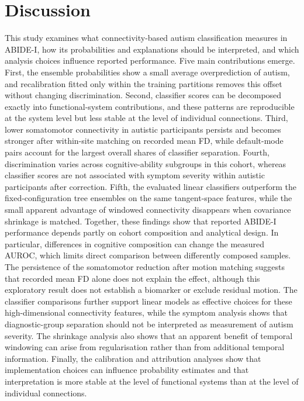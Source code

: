 \section{Discussion}
\label{sec:discussion}

This study examines what connectivity-based autism classification measures in ABIDE-I, how its probabilities and explanations should be interpreted, and which analysis choices influence reported performance. Five main contributions emerge. First, the ensemble probabilities show a small average overprediction of autism, and recalibration fitted only within the training partitions removes this offset without changing discrimination. Second, classifier scores can be decomposed exactly into functional-system contributions, and these patterns are reproducible at the system level but less stable at the level of individual connections. Third, lower somatomotor connectivity in autistic participants persists and becomes stronger after within-site matching on recorded mean FD, while default-mode pairs account for the largest overall shares of classifier separation. Fourth, discrimination varies across cognitive-ability subgroups in this cohort, whereas classifier scores are not associated with symptom severity within autistic participants after correction. Fifth, the evaluated linear classifiers outperform the fixed-configuration tree ensembles on the same tangent-space features, while the small apparent advantage of windowed connectivity disappears when covariance shrinkage is matched. Together, these findings show that reported ABIDE-I performance depends partly on cohort composition and analytical design. In particular, differences in cognitive composition can change the measured AUROC, which limits direct comparison between differently composed samples. The persistence of the somatomotor reduction after motion matching suggests that recorded mean FD alone does not explain the effect, although this exploratory result does not establish a biomarker or exclude residual motion. The classifier comparisons further support linear models as effective choices for these high-dimensional connectivity features, while the symptom analysis shows that diagnostic-group separation should not be interpreted as measurement of autism severity. The shrinkage analysis also shows that an apparent benefit of temporal windowing can arise from regularisation rather than from additional temporal information. Finally, the calibration and attribution analyses show that implementation choices can influence probability estimates and that interpretation is more stable at the level of functional systems than at the level of individual connections.

